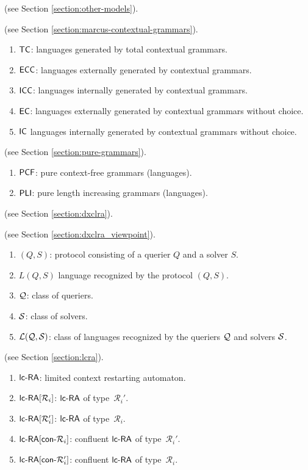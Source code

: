  (see Section \ref{section:other-models}).

 (see Section \ref{section:marcus-contextual-grammars}).

\begin{enumerate}[]
\item $\textup{\sf TC}$: languages generated by total contextual grammars.
\item $\textup{\sf ECC}$: languages externally generated by contextual grammars.
\item $\textup{\sf ICC}$: languages internally generated by contextual grammars.
\item $\textup{\sf EC}$: languages externally generated by contextual grammars without choice.
\item $\textup{\sf IC}$ languages internally generated by contextual grammars without choice.
\end{enumerate}

 (see Section \ref{section:pure-grammars}).

\begin{enumerate}[]
\item $\textup{\sf PCF}$: pure context-free grammars (languages).
\item $\textup{\sf PLI}$: pure length increasing grammars (languages).
\end{enumerate}

 (see Section \ref{section:dxclra}).

 (see Section \ref{section:dxclra_viewpoint}).

\begin{enumerate}[]
\item $(Q, S)$: protocol consisting of a querier $Q$ and a solver $S$.
\item $L(Q, S)$ language recognized by the protocol $(Q, S)$.
\item $\mathcal{Q}$: class of queriers.
\item $\mathcal{S}$: class of solvers.
\item ${\cal L}(\mathcal{Q}, \mathcal{S})$: class of languages recognized by the queriers $\mathcal{Q}$ and solvers $\mathcal{S}$.
\end{enumerate}

 (see Section \ref{section:lcra}).

\begin{enumerate}[]
\item $\lcRA$: limited context restarting automaton.
\item $\lcRA[i]$: $\lcRA$ of type~$\mathcal{R}_i'$.
\item $\lcRAp[i]$: $\lcRA$ of type~$\mathcal{R}_i$.
\item $\textup{\sf lc-RA$[\textup{\sf con-}\mathcal{R}_i]$}$: confluent $\lcRA$ of type~$\mathcal{R}_i'$.
\item $\textup{\sf lc-RA$[\textup{\sf con-}\mathcal{R}_i']$}$: confluent $\lcRA$ of type~$\mathcal{R}_i$.
\end{enumerate}
